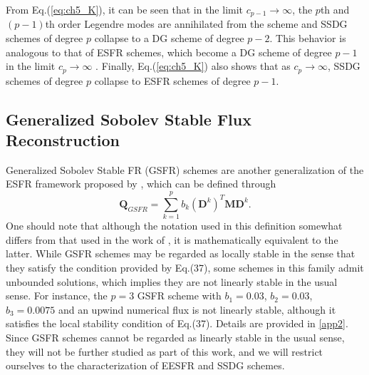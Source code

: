 \documentclass[preprint,12pt]{elsarticle}
\begin{document}
From Eq.(\ref{eq:ch5_K}), it can be seen that in the limit $c_{p-1} \to \infty$, the $p$th and $(p-1)$th order Legendre modes are annihilated from the scheme and SSDG schemes of degree $p$ collapse to a DG scheme of degree $p-2$. This behavior is analogous to that of ESFR schemes, which become a DG scheme of degree $p-1$ in the limit $c_p \to \infty$ \cite{vincent2011new}. Finally, Eq.(\ref{eq:ch5_K}) also shows that as $c_{p} \to \infty$, SSDG schemes of degree $p$ collapse to ESFR schemes of degree $p-1$.

\subsection{Generalized Sobolev Stable Flux Reconstruction}
Generalized Sobolev Stable FR (GSFR) schemes are another generalization of the ESFR framework proposed by \cite{trojak2019GSFR}, which can be defined through
\begin{equation}
    \mathbf{Q}_{GSFR} = \sum_{k=1}^p b_k(\mathbf{D}^k)^T \mathbf{M} \mathbf{D}^k.
\end{equation}
One should note that although the notation used in this definition somewhat differs from that used in the work of \cite{trojak2019GSFR}, it is mathematically equivalent to the latter. While GSFR schemes may be regarded as locally stable in the sense that they satisfy the condition provided by \cite{trojak2019GSFR} Eq.(37), some schemes in this family admit unbounded solutions, which implies they are not linearly stable in the usual sense. For instance, the $p=3$ GSFR scheme with $b_1 = 0.03$, $b_2 = 0.03$, $b_3=0.0075$ and an upwind numerical flux is not linearly stable, although it satisfies the local stability condition of \cite{trojak2019GSFR} Eq.(37). Details are provided in \ref{app2}. Since GSFR schemes cannot be regarded as linearly stable in the usual sense, they will not be further studied as part of this work, and we will restrict ourselves to the characterization of EESFR and SSDG schemes.
\end{document}

